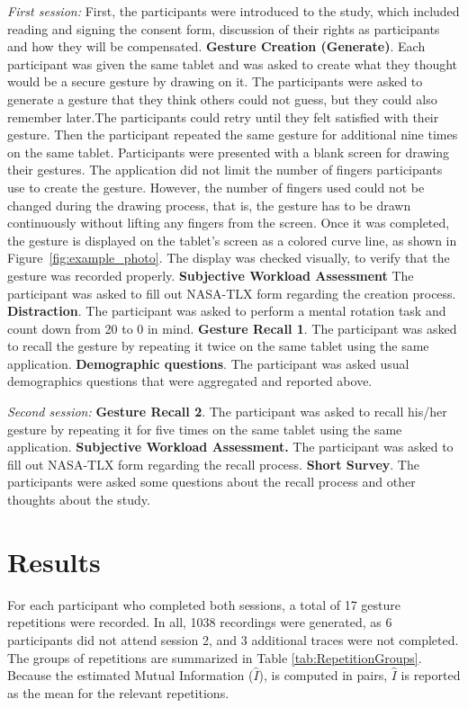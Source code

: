 \documentclass{sig-alternate-10pt}
\begin{document}
\textit{First session:} First, the participants were introduced to the study, which included reading and signing the consent form, discussion of their rights as participants and how they will be compensated. \textbf{Gesture Creation (Generate)}. Each participant was given the same tablet and was asked to create what they thought would be a secure gesture by drawing on it. The participants were asked to generate a gesture that they think others could not guess, but they could also remember later.The participants could retry until they felt satisfied with their gesture. Then the participant repeated the same gesture for additional nine times on the same tablet. Participants were presented with a blank screen for drawing their gestures. The application did not limit the number of fingers participants use to create the gesture. However, the number of fingers used could not be changed during the drawing process, that is, the gesture has to be drawn continuously without lifting any fingers from the screen.
Once it was completed, the gesture is displayed on the tablet's screen as a colored curve line, as shown in Figure~\ref{fig:example_photo}. The display was checked visually, to verify that the gesture was recorded properly. \textbf{Subjective Workload Assessment} The participant was asked to fill out NASA-TLX form regarding the creation process. \textbf{Distraction}. The participant was asked to perform a mental rotation task and count down from 20 to 0 in mind.
\textbf{Gesture Recall 1}. The participant was asked to recall the gesture by repeating it twice on the same tablet using the same application.
 \textbf{Demographic questions}. The participant was asked usual demographics questions that were aggregated and reported above.


\textit{Second session:}  \textbf{Gesture Recall 2}. The participant was asked to recall his/her gesture by repeating it for five times on the same tablet using the same application.  \textbf{Subjective Workload Assessment.} The participant was asked to fill out NASA-TLX form regarding the recall process. \textbf{Short Survey}. The participants were asked some questions about the recall process and other thoughts about the study.

\newpage

\section{Results}


For each participant who completed both sessions, a total of 17 gesture repetitions were recorded. In all, 1038 recordings were generated, as 6 participants did not attend session 2, and 3 additional traces were not completed. The groups of repetitions are summarized in Table \ref{tab:RepetitionGroups}. Because the estimated Mutual Information ($\hat I$), is computed in pairs, $\hat I$ is reported as the mean for the relevant repetitions.
\end{document}
